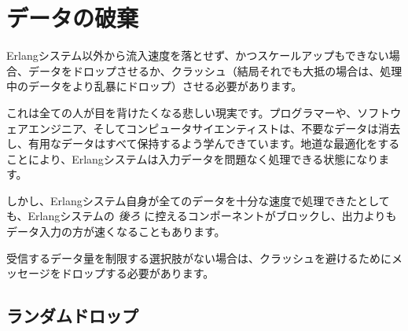 \section{データの破棄}

Erlangシステム以外から流入速度を落とせず、かつスケールアップもできない場合、データをドロップさせるか、クラッシュ（結局それでも大抵の場合は、処理中のデータをより乱暴にドロップ）させる必要があります。

これは全ての人が目を背けたくなる悲しい現実です。プログラマーや、ソフトウェアエンジニア、そしてコンピュータサイエンティストは、不要なデータは消去し、有用なデータはすべて保持するよう学んできています。地道な最適化をすることにより、Erlangシステムは入力データを問題なく処理できる状態になります。

しかし、Erlangシステム自身が全てのデータを十分な速度で処理できたとしても、Erlangシステムの \emph{後ろ} に控えるコンポーネントがブロックし、出力よりもデータ入力の方が速くなることもあります。

受信するデータ量を制限する選択肢がない場合は、クラッシュを避けるためにメッセージをドロップする必要があります。

\subsection{ランダムドロップ}


